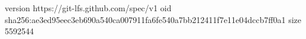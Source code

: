 version https://git-lfs.github.com/spec/v1
oid sha256:ae3ed95eec3eb690a540ca007911fa6fe540a7bb212411f7e11e04dccb7ff0a1
size 5592544
